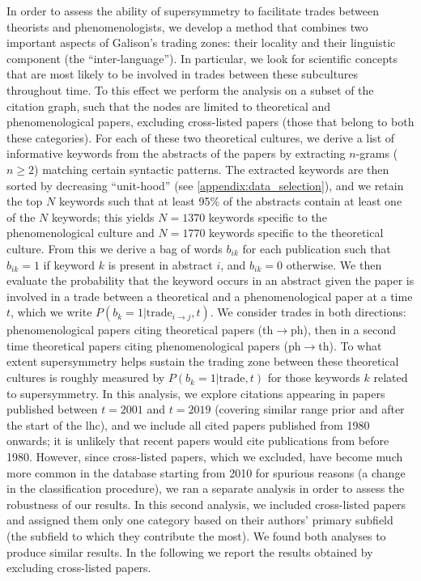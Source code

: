 \documentclass[smallextended]{svjour3}
\begin{document}
In order to assess the ability of supersymmetry to facilitate trades between theorists and phenomenologists, we develop a method that combines two important aspects of Galison's trading zones: their locality and their linguistic component (the ``inter-language''). In particular, we look for scientific concepts that are most likely to be involved in trades between these subcultures throughout time. To this effect we perform the analysis on a subset of the citation graph, such that the nodes are limited to theoretical and phenomenological papers, excluding cross-listed papers (those that belong to both these categories). For each of these two theoretical cultures, we derive a list of informative keywords from the abstracts of the papers by extracting $n$-grams ($n\geq 2$) matching certain syntactic patterns. The extracted keywords are then sorted by decreasing ``unit-hood'' (see \ref{appendix:data_selection}), and we retain the top $N$ keywords such that at least 95\% of the abstracts contain at least one of the $N$ keywords; this yields $N=1370$ keywords specific to the phenomenological culture and $N=1770$ keywords specific to the theoretical culture. From this we derive a bag of words $b_{ik}$ for each publication such that $b_{ik}=1$ if keyword $k$ is present in abstract $i$, and $b_{ik}=0$ otherwise. We then evaluate the probability that the keyword occurs in an abstract given the paper is involved in a trade between a theoretical and a phenomenological paper at a time $t$, which we write $P(b_k=1|\text{trade}_{i\to j},t)$. We consider trades in both directions: phenomenological papers citing theoretical papers (th$\to$ph), then in a second time theoretical papers citing phenomenological papers (ph$\to$th). To what extent supersymmetry helps sustain the trading zone between these theoretical cultures is roughly measured by $P(b_k=1|\text{trade},t)$ for those keywords $k$ related to supersymmetry. In this analysis, we explore citations appearing in papers published between $t=2001$ and $t=2019$ (covering similar range prior and after the start of the \gls{lhc}), and we include all cited papers published from 1980 onwards; it is unlikely that recent papers would cite publications from before 1980. However, since cross-listed papers, which we excluded, have become much more common in the database starting from 2010 for spurious reasons (a change in the classification procedure), we ran a separate analysis in order to assess the robustness of our results. In this second analysis, we included cross-listed papers and assigned them only one category based on their authors' primary subfield (the subfield to which they contribute the most). We found both analyses to produce similar results. In the following we report the results obtained by excluding cross-listed papers.
\end{document}
